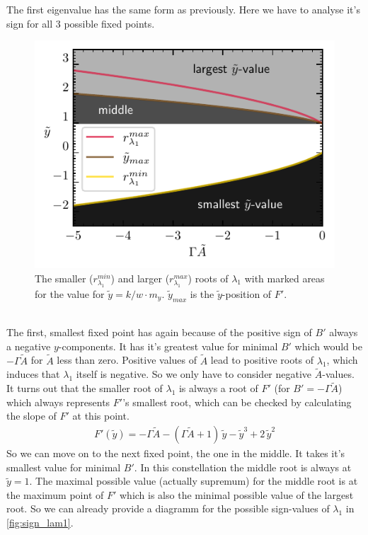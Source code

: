 \documentclass{article}
\begin{document}
The first eigenvalue has the same form as previously. Here we have to analyse it's sign for all 3 possible fixed points. 
\begin{figure}
    \includegraphics{pictures/sign_of_ev1.pdf}
    \vspace*{-2cm}\caption{The smaller ($r_{\lambda_1}^{min}$) and larger ($r_{\lambda_1}^{max}$) roots of $\lambda_1$ with marked areas for the value for $\tilde{y}=k/w\cdot m_y$. $\tilde{y}_{max}$ is the $\tilde{y}$-position of $F'$.}
    \label{fig:sign_lam1}
\end{figure}\\
The first, smallest fixed point has again because of the positive sign of $B'$ always a negative $y$-components. It has it's greatest value for minimal $B'$ which would be $-\Gamma\tilde{A}$ for $\tilde{A}$ less than zero. Positive values of $\tilde{A}$ lead to positive roots of $\lambda_1$, which induces that $\lambda_1$ itself is negative. So we only have to consider negative $\tilde{A}$-values. It turns out that the smaller root of $\lambda_1$ is always a root of $F'$ (for $B'=-\Gamma\tilde{A}$) which always represents $F'$'s smallest root, which can be checked by calculating the slope of $F'$ at this point.
\begin{align*}
    F'(\tilde{y})=-\Gamma\tilde{A}-(\Gamma \tilde{A}+1)\,\tilde{y}    - \tilde{y}^3+2\,\tilde{y}^2
\end{align*}
So we can move on to the next fixed point, the one in the middle. It takes it's smallest value for minimal $B'$. In this constellation the middle root is always at $\tilde{y}=1$. The maximal possible value (actually supremum) for the middle root is at the maximum point of $F'$ which is also the minimal possible value of the largest root. So we can already provide a diagramm for the possible sign-values of $\lambda_1$ in \autoref{fig:sign_lam1}.\\\\
\end{document}
